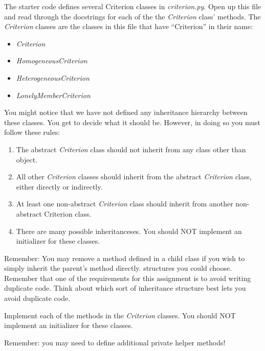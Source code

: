 \documentclass[12pt]{article}
\begin{document}
\bigskip

\noindent The starter code defines several Criterion classes in \textit{criterion.py}. Open
up this file and read through the docstrings for each of the the \textit{Criterion}
class’ methods. The \textit{Criterion} classes are the classes in this file that
have “Criterion” in their name:

\begin{itemize}
    \item \textit{Criterion}
    \item \textit{HomogeneousCriterion}
    \item \textit{HeterogeneousCriterion}
    \item \textit{LonelyMemberCriterion}
\end{itemize}

\bigskip

You might notice that we have not defined any inheritance hierarchy between these
classes. You get to decide what it should be. However, in doing so you must
follow these rules:

\begin{enumerate}[1.]
    \item The abstract \textit{Criterion} class should not inherit from any class
    other than object.
    \item All other \textit{Criterion} classes should inherit from the abstract \textit{Criterion}
    class, either directly or indirectly.
    \item At least one non-abstract \textit{Criterion} class should inherit from another
    non-abstract Criterion class.
    \item There are many possible inheritanceses. You should NOT implement an
    initializer for these classes.
\end{enumerate}

\bigskip

\noindent Remember: You may remove a method defined in a child class if you wish to
simply inherit the parent’s method directly. structures you could choose. Remember
that one of the requirements for this assignment is to avoid writing duplicate code.
Think about which sort of inheritance structure best lets you avoid duplicate code.

\bigskip

\noindent Implement each of the methods in the \textit{Criterion} classes. You should NOT implement
an initializer for these classes.

\noindent Remember: you may need to define additional private helper methods!
\end{document}
